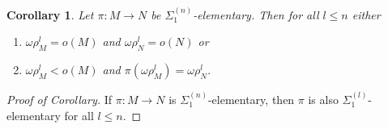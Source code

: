 \documentclass[12pt,a4paper]{article}
\theoremstyle{nicestyle}
\newtheorem{corollary}{Corollary}[subsection]
\begin{document}
    \begin{corollary}
      Let $\pi \colon M \to N$ be $\Sigma^{(n)}_{1}$-elementary. Then for all $l \le n$ either
      \begin{enumerate}
      \item $\omega\rho^{l}_{M} = o(M)$ and
        $\omega\rho^{l}_{N} = o(N)$ or
      \item $\omega\rho^{l}_{M} < o(M)$ and
        $\pi(\omega\rho^{l}_{M}) = \omega\rho^{l}_{N}$.
      \end{enumerate}
      \end{corollary}

      \begin{proof}[Proof of Corollary]
        If $\pi \colon M \to N$ is $\Sigma^{(n)}_{1}$-elementary, then
        $\pi$ is also $\Sigma^{(l)}_{1}$-elementary for all $l \le n$.
      \end{proof}
    
\end{document}
